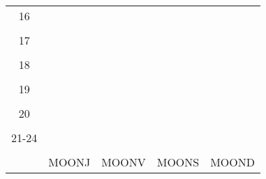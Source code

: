 \begin{tabularx}{\linewidth}{|c|X|X|p{2cm}|p{2cm}|}
            &   &       &    &   \\
          \hline
          16&   &                 &    &   \\
            &   &       &    &   \\
          \hline
          17&   &                 &    &   \\
            &   &       &    &   \\
          \hline
          18&   &                 &    &   \\
            &   &       &    &   \\
          \hline
          19&   &                 &     &   \\
            &   &       &    &   \\
          \hline
          20&   &              &    &   \\
            &   &       &    &   \\
          \hline 
          21-24&   &              &    &   \\
            &   &       &    &   \\
          \hline
                      & MOONJ & MOONV & MOONS & MOOND\\
          \hline    
        \end{tabularx}
